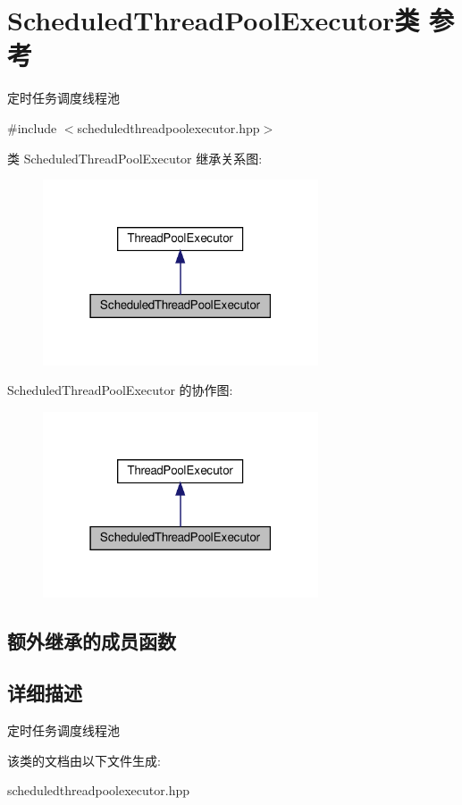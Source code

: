 \hypertarget{classScheduledThreadPoolExecutor}{}\section{Scheduled\+Thread\+Pool\+Executor类 参考}
\label{classScheduledThreadPoolExecutor}


定时任务调度线程池  




{\ttfamily \#include $<$scheduledthreadpoolexecutor.\+hpp$>$}



类 Scheduled\+Thread\+Pool\+Executor 继承关系图\+:\nopagebreak
\begin{figure}[H]
\begin{center}
\leavevmode
\includegraphics[width=231pt]{classScheduledThreadPoolExecutor__inherit__graph}
\end{center}
\end{figure}


Scheduled\+Thread\+Pool\+Executor 的协作图\+:\nopagebreak
\begin{figure}[H]
\begin{center}
\leavevmode
\includegraphics[width=231pt]{classScheduledThreadPoolExecutor__coll__graph}
\end{center}
\end{figure}
\subsection*{额外继承的成员函数}


\subsection{详细描述}
定时任务调度线程池 

该类的文档由以下文件生成\+:\begin{DoxyCompactItemize}
\item 
scheduledthreadpoolexecutor.\+hpp\end{DoxyCompactItemize}
